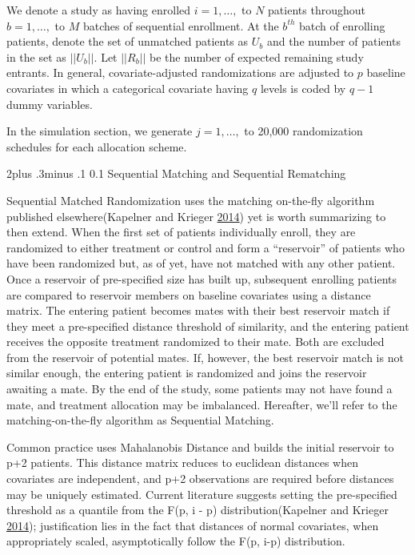 \documentclass[12pt,oneside]{book}
\makeatletter
\newlength{\li}\setlength{\li}{14.48pt}
\newlength{\di}\setlength{\di}{-3.5mm}
\renewcommand\section{ \@startsection {section}{1}{\z@}%
    {2\@bls  plus .3\@bls minus .1\@bls}%
    {0.1\@bls}%
    {\centering\normalfont}}
\theoremstyle{definition}
\theoremstyle{definition}
\theoremstyle{definition}
\theoremstyle{remark}
\makeatother
\begin{document}
We denote a study as having enrolled \(i = 1, \dots,\) to \(N\) patients
throughout \(b = 1,\dots,\) to \(M\) batches of sequential enrollment.
At the \(b^{th}\) batch of enrolling patients, denote the set of
unmatched patients as \(U_b\) and the number of patients in the set as
\(||U_b||\). Let \(||R_b||\) be the number of expected remaining study
entrants. In general, covariate-adjusted randomizations are adjusted to
\(p\) baseline covariates in which a categorical covariate having \(q\)
levels is coded by \(q-1\) dummy variables.

In the simulation section, we generate \(j = 1, \dots,\) to 20,000
randomization schedules for each allocation scheme.

\hypertarget{sequential-matching-and-sequential-rematching}{%
\section{Sequential Matching and Sequential
Rematching}\label{sequential-matching-and-sequential-rematching}}

Sequential Matched Randomization uses the matching on-the-fly algorithm
published elsewhere(Kapelner and Krieger
\protect\hyperlink{ref-Kapelner:2014cu}{2014}) yet is worth summarizing
to then extend. When the first set of patients individually enroll, they
are randomized to either treatment or control and form a ``reservoir''
of patients who have been randomized but, as of yet, have not matched
with any other patient. Once a reservoir of pre-specified size has built
up, subsequent enrolling patients are compared to reservoir members on
baseline covariates using a distance matrix. The entering patient
becomes mates with their best reservoir match if they meet a
pre-specified distance threshold of similarity, and the entering patient
receives the opposite treatment randomized to their mate. Both are
excluded from the reservoir of potential mates. If, however, the best
reservoir match is not similar enough, the entering patient is
randomized and joins the reservoir awaiting a mate. By the end of the
study, some patients may not have found a mate, and treatment allocation
may be imbalanced. Hereafter, we'll refer to the matching-on-the-fly
algorithm as Sequential Matching.

Common practice uses Mahalanobis Distance and builds the initial
reservoir to p+2 patients. This distance matrix reduces to euclidean
distances when covariates are independent, and p+2 observations are
required before distances may be uniquely estimated. Current literature
suggests setting the pre-specified threshold as a quantile from the F(p,
i - p) distribution(Kapelner and Krieger
\protect\hyperlink{ref-Kapelner:2014cu}{2014}); justification lies in
the fact that distances of normal covariates, when appropriately scaled,
asymptotically follow the F(p, i-p) distribution.
\end{document}
